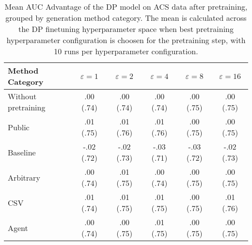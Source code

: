 \begin{table}[h!]
    \centering
    \caption{Mean AUC Advantage of the DP model on ACS data after pretraining, grouped by generation method category. The mean is calculated across the DP finetuning hyperparameter space when best pretraining hyperparameter configuration is choosen for the pretraining step, with 10 runs per hyperparameter configuration.}
    \label{tab:epsilon_comparison}
    \begin{tabular}{lccccc}
    \toprule
    Method Category & $\varepsilon=1$ & $\varepsilon=2$ & $\varepsilon=4$ & $\varepsilon=8$ & $\varepsilon=16$ \\
    \midrule
    Without pretraining & .00 {\small (.74)} & .00 {\small (.74)} & .00 {\small (.74)} & .00 {\small (.75)} & .00 {\small (.75)} \\
    \arrayrulecolor{black!50!}\midrule
    Public & \cellcolor{gold!30}.01 {\small (.75)} & \cellcolor{gold!30}.01 {\small (.76)} & \cellcolor{gold!30}.01 {\small (.76)} & \cellcolor{gold!30}.00 {\small (.75)} & \cellcolor{silver!30}.00 {\small (.75)} \\
    \arrayrulecolor{black!50!}\midrule
    Baseline & -.02 {\small (.72)} & -.02 {\small (.73)} & -.03 {\small (.71)} & -.03 {\small (.72)} & -.02 {\small (.73)} \\
    \arrayrulecolor{black!50!}\midrule
    Arbitrary & .00 {\small (.74)} & \cellcolor{bronze!30}.01 {\small (.75)} & .00 {\small (.74)} & \cellcolor{bronze!30}.00 {\small (.75)} & \cellcolor{bronze!30}.00 {\small (.75)} \\
    \arrayrulecolor{black!50!}\midrule
    CSV & \cellcolor{silver!30}.01 {\small (.74)} & \cellcolor{silver!30}.01 {\small (.75)} & \cellcolor{silver!30}.01 {\small (.75)} & \cellcolor{gold!30}.00 {\small (.75)} & \cellcolor{gold!30}.01 {\small (.76)} \\
    Agent & \cellcolor{bronze!30}.00 {\small (.74)} & .00 {\small (.75)} & \cellcolor{bronze!30}.01 {\small (.75)} & \cellcolor{silver!30}.00 {\small (.75)} & \cellcolor{silver!30}.00 {\small (.75)} \\
    \bottomrule
    \end{tabular}
\end{table}